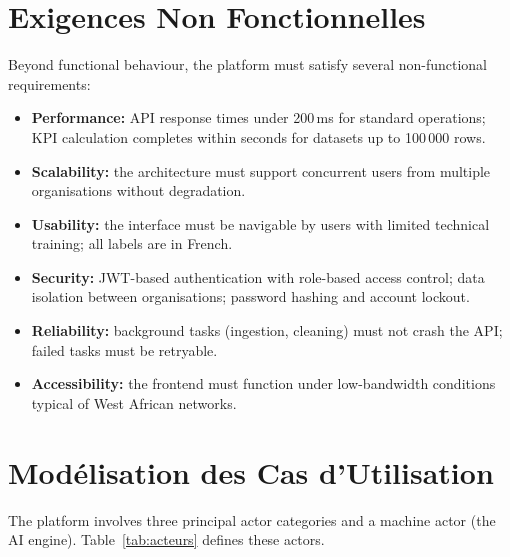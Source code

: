 \section{Exigences Non Fonctionnelles}

\noindent
Beyond functional behaviour, the platform must satisfy
several non-functional requirements:

\begin{itemize}
  \item \textbf{Performance:} API response times under 200\,ms
        for standard operations; KPI calculation
        completes within seconds for datasets
        up to 100\,000 rows.
  \item \textbf{Scalability:} the architecture must support
        concurrent users from multiple organisations
        without degradation.
  \item \textbf{Usability:} the interface must be navigable
        by users with limited technical training;
        all labels are in French.
  \item \textbf{Security:} JWT-based authentication with
        role-based access control;
        data isolation between organisations;
        password hashing and account lockout.
  \item \textbf{Reliability:} background tasks (ingestion,
        cleaning) must not crash the API;
        failed tasks must be retryable.
  \item \textbf{Accessibility:} the frontend must function
        under low-bandwidth conditions
        typical of West African networks.
\end{itemize}


\section{Modélisation des Cas d'Utilisation}

\noindent
The platform involves three principal actor categories
and a machine actor (the AI engine).
Table~\ref{tab:acteurs} defines these actors.

